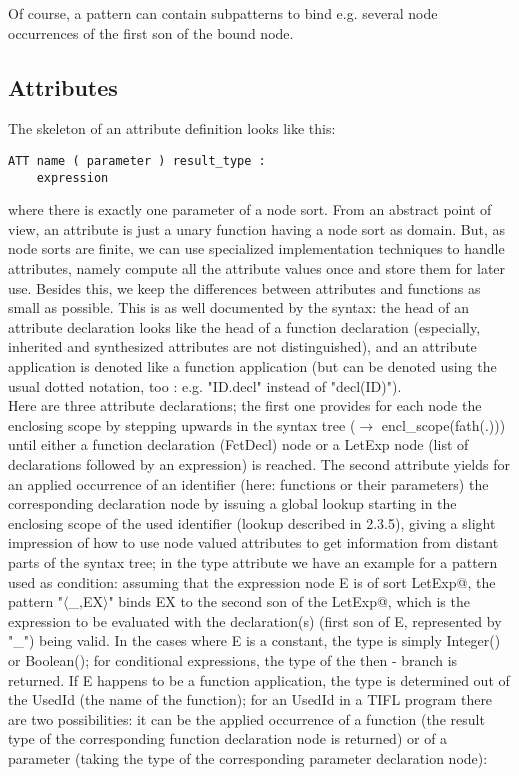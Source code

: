 \noindent
Of course, a pattern can contain subpatterns to bind e.g. several node occurrences of the first son of the bound node.
\subsection{Attributes}
The skeleton of an attribute definition looks like this:
\begin{verbatim}
ATT name ( parameter ) result_type :
    expression
\end{verbatim}
where there is exactly one parameter of a node sort.
\noindent
From an abstract point of view, an attribute is just a unary function having a node sort as domain. But, as node sorts are finite, we can use specialized implementation techniques to handle attributes, namely compute all the attribute values once and store them for later use. Besides this, we keep the differences between attributes and functions as small as possible. This is as well documented by the syntax: the head of an attribute declaration looks like the head of a function declaration (especially, inherited and synthesized attributes are not distinguished), and an attribute application is denoted like a function application (but can be denoted using the usual dotted notation, too : e.g. "ID.decl" instead of "decl(ID)").\\
Here are three attribute declarations; the first one provides for each node the enclosing scope by stepping upwards in the syntax tree ($\rightarrow$ encl\_scope(fath(.))) until either a function declaration (FctDecl) node or a LetExp node (list of declarations followed by an expression) is reached. The second attribute yields for an applied occurrence of an identifier (here: functions or their parameters) the corresponding declaration node by issuing a global lookup starting in the enclosing scope of the used identifier (lookup described in 2.3.5), giving a slight impression of how to use node valued attributes to get information from distant parts of the syntax tree; in the type attribute we have an example for a pattern used as condition: assuming that the expression node E is of sort LetExp@, the pattern "$\langle$\_,EX$\rangle$" binds EX to the second son of the LetExp@, which is the expression to be evaluated with the declaration(s) (first son of E, represented by "\_") being valid.
 In the cases where E is a constant, the type is simply Integer() or Boolean(); for conditional expressions, the type of the then - branch is returned. If E happens to be a function application, the type is determined out of the UsedId (the name of the function); for an UsedId in a TIFL program there are two possibilities: it can be the applied occurrence of a function (the result type of the corresponding function declaration node is returned) or of a parameter (taking the type of the corresponding parameter declaration node): 

